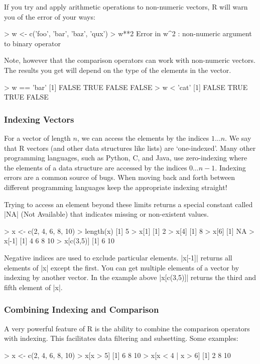 If you try and apply arithmetic operations to non-numeric vectors, R will warn you of the error of your ways:
%
\begin{R}
> w <- c('foo', 'bar', 'baz', 'qux')
> w**2
Error in w^2 : non-numeric argument to binary operator
\end{R}
%
Note, however that the comparison operators can work with non-numeric vectors. The results you get will depend on the type of the elements in the vector.
%
\begin{R}
>  w == 'bar'
[1] FALSE  TRUE FALSE FALSE
> w < 'cat'
[1] FALSE  TRUE  TRUE FALSE
\end{R}


\subsubsection{Indexing Vectors}

For a vector of length $n$, we can access the elements by the indices $1
\ldots n$. We say that R vectors (and other data structures like lists) are `one-indexed'. Many other programming languages, such as Python, C, and Java, use zero-indexing where the elements of a data structure are accessed by the indices $0 \ldots n-1$. Indexing errors are a common source of bugs. When moving back and forth between different programming languages keep the appropriate indexing straight!

Trying to access an element beyond these limits returns a special
constant called |NA| (Not Available) that indicates missing or non-existent
values.
%
\begin{R}
> x <- c(2, 4, 6, 8, 10)
> length(x)
[1] 5
> x[1]
[1] 2
> x[4]
[1] 8
> x[6]
[1] NA
> x[-1]
[1]  4  6  8 10
> x[c(3,5)]
[1]  6 10
\end{R}
%
Negative indices are used to exclude particular elements. |x[-1]| returns all
elements of |x| except the first. You can get multiple elements of a vector by
indexing by another vector. In the example above |x[c(3,5)]| returns the third
and fifth element of |x|.

\subsubsection{Combining Indexing and Comparison}

A very powerful feature of R is the ability to combine the comparison
operators with indexing. This facilitates data filtering and subsetting.
Some examples:
%
\begin{R}
> x <- c(2, 4, 6, 8, 10)
> x[x > 5]
[1]  6  8 10
> x[x < 4 | x > 6]
[1]  2  8 10
\end{R}
%

